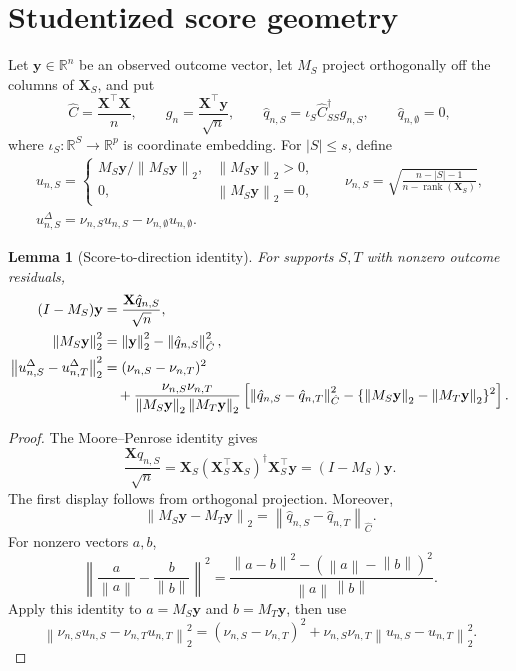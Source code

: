 \documentclass[a4paper,11pt,english]{article}
\newtheorem{lemma}[theorem]{Lemma}
\newcommand{\norm}[1]{\left\lVert #1\right\rVert}
\newcommand{\R}{\mathbb R}
\begin{document}
\section{Studentized score geometry}

Let $\mathbf y\in\R^n$ be an observed outcome vector, let $M_S$ project
orthogonally off the columns of $\mathbf X_S$, and put
\[
        \hat C=\frac{\mathbf X^\top\mathbf X}{n},
        \qquad
        g_n=\frac{\mathbf X^\top\mathbf y}{\sqrt n},
        \qquad
        \hat q_{n,S}=\iota_S\hat C_{SS}^{\dagger}g_{n,S},
        \qquad \hat q_{n,\emptyset}=0,
\]
where $\iota_S:\R^S\to\R^p$ is coordinate embedding.  For
$|S|\le s$, define
\begin{equation}\label{eq:studentized-directions}
\begin{gathered}
        u_{n,S}=\begin{cases}
        M_S\mathbf y/\norm{M_S\mathbf y}_2,
        &\norm{M_S\mathbf y}_2>0,\\
        0,&\norm{M_S\mathbf y}_2=0,
        \end{cases}
        \qquad
        \nu_{n,S}
        =\sqrt{\frac{n-|S|-1}{n-\operatorname{rank}(\mathbf X_S)}},\\
        u_{n,S}^{\Delta}
        =\nu_{n,S}u_{n,S}
        -\nu_{n,\emptyset}u_{n,\emptyset}.
\end{gathered}
\end{equation}

\begin{lemma}[Score-to-direction identity]
\label{lem:studentized-score-direction}
For supports $S,T$ with nonzero outcome residuals,
\begin{align}
        (I-M_S)\mathbf y&=\frac{\mathbf X\hat q_{n,S}}{\sqrt n}, \notag\\
        \norm{M_S\mathbf y}_2^2
        &=\norm{\mathbf y}_2^2-\norm{\hat q_{n,S}}_{\hat C}^2,
        \label{eq:score-projection-identity}\\
 \norm{u_{n,S}^{\Delta}-u_{n,T}^{\Delta}}_2^2
 &= (\nu_{n,S}-\nu_{n,T})^2 \notag\\
 &\quad+\frac{\nu_{n,S}\nu_{n,T}}
 {\norm{M_S\mathbf y}_2\norm{M_T\mathbf y}_2}
 \left[
 \norm{\hat q_{n,S}-\hat q_{n,T}}_{\hat C}^2
 -\{\norm{M_S\mathbf y}_2-\norm{M_T\mathbf y}_2\}^2
 \right].
 \label{eq:studentized-score-direction-bridge}
\end{align}
\end{lemma}

\begin{proof}
The Moore--Penrose identity gives
\[
        \frac{\mathbf X\hat q_{n,S}}{\sqrt n}
        =\mathbf X_S(\mathbf X_S^\top\mathbf X_S)^\dagger
        \mathbf X_S^\top\mathbf y=(I-M_S)\mathbf y.
\]
The first display follows from orthogonal projection.  Moreover,
\[
        \norm{M_S\mathbf y-M_T\mathbf y}_2
        =\norm{\hat q_{n,S}-\hat q_{n,T}}_{\hat C}.
\]
For nonzero vectors $a,b$,
\[
 \left\|\frac a{\norm a}-\frac b{\norm b}\right\|^2
 =\frac{\norm{a-b}^2-(\norm a-\norm b)^2}
 {\norm a\,\norm b}.
\]
Apply this identity to $a=M_S\mathbf y$ and $b=M_T\mathbf y$, then use
\[
 \norm{\nu_{n,S}u_{n,S}-\nu_{n,T}u_{n,T}}_2^2
 =(\nu_{n,S}-\nu_{n,T})^2
 +\nu_{n,S}\nu_{n,T}\norm{u_{n,S}-u_{n,T}}_2^2.
\]
\end{proof}
\end{document}
